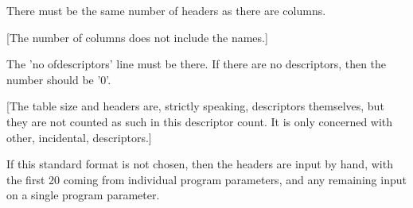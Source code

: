 {{   There must be the same number of headers as there are columns.
                                                                               
   [The number of columns does not include the names.]
                                                                               
   The 'no ofdescriptors' line must be there. If there are no
   descriptors, then the number should be '0'.
                                                                               
   [The table size and headers are, strictly speaking, descriptors
    themselves, but they are not counted as such in this
    descriptor count. It is only concerned with other, incidental,
    descriptors.]
                                                                               
                                                                               
  If this standard format is not chosen, then the headers are input by
  hand, with the first 20 coming from individual program parameters, and
  any remaining input on a single program parameter.
                                                                               
                                                                               
}}
